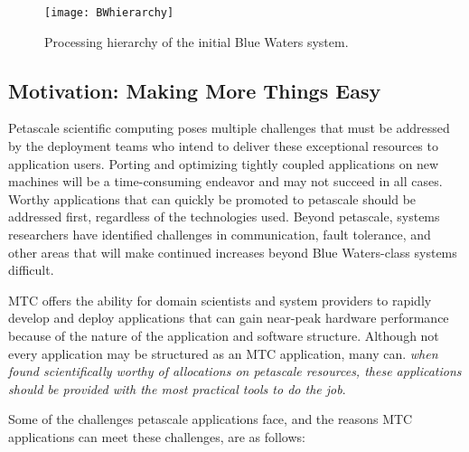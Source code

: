 \documentclass[10pt,letterpaper]{article}
\begin{document}
\begin{figure}[h]
    \center
    \texttt{[image: BWhierarchy]}
    \caption {Processing hierarchy of the initial Blue Waters system.}
    \label{BWhierarchy}
\end{figure}

\subsection{Motivation: Making More Things Easy}

Petascale scientific computing poses multiple challenges that
must be addressed by the deployment teams who intend to deliver these
exceptional resources to application users.  Porting and
optimizing tightly coupled applications on new machines will be a
time-consuming endeavor and may not succeed in all cases.  Worthy
applications that can quickly be promoted to petascale should be addressed first,
regardless of the technologies used.  Beyond petascale, systems
researchers have identified challenges in communication, fault
tolerance, and other areas that will make continued increases beyond
Blue Waters-class systems difficult.

MTC offers the ability for domain scientists and system providers to
rapidly develop and deploy applications that can gain near-peak
hardware performance because of the nature of the application and software
structure.  Although not every application may be structured as an MTC
application, many can. \emph{when found scientifically worthy of allocations on
petascale resources, these applications should be provided with the
most practical tools to do the job}.

Some of the challenges petascale applications face, and the reasons
MTC applications can meet these challenges, are as follows:
\end{document}
